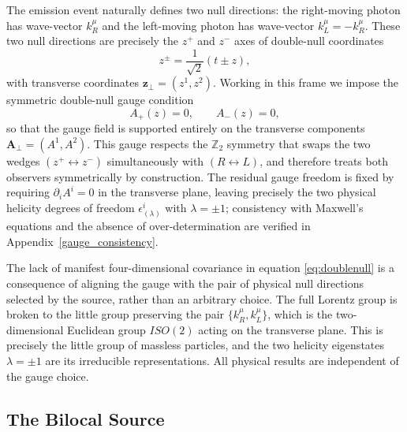 \documentclass[12pt,a4paper]{article}
\begin{document}
The emission event naturally defines two null directions: the right-moving photon has
wave-vector $k^\mu_R$ and the left-moving photon has wave-vector $k^\mu_L = -k^\mu_R$. These
two null directions are precisely the $z^+$ and $z^-$ axes of double-null coordinates
\begin{equation}
    z^\pm = \frac{1}{\sqrt{2}}(t \pm z),
\end{equation}
with transverse coordinates $\mathbf{z}_\perp = (z^1, z^2)$. Working in this frame we impose
the symmetric double-null gauge condition
\begin{equation}
    A_+(z) = 0, \qquad A_-(z) = 0,
\label{eq:doublenull}
\end{equation}
so that the gauge field is supported entirely on the transverse components $\mathbf{A}_\perp = (A^1, A^2)$. This gauge respects the $\mathbb{Z}_2$ symmetry that swaps the two wedges $(z^+ \leftrightarrow z^-)$ simultaneously with $(R \leftrightarrow L)$, and therefore treats both observers symmetrically by construction. The residual gauge freedom is fixed by requiring $\partial_i A^i = 0$ in the transverse plane, leaving precisely the two physical helicity degrees of freedom $\epsilon^i_{(\lambda)}$ with $\lambda = \pm 1$; consistency with 
Maxwell's equations and the absence of over-determination are 
verified in Appendix~\ref{gauge_consistency}.

The lack of manifest four-dimensional covariance in equation \eqref{eq:doublenull} is a consequence of aligning the gauge with the pair of physical null directions selected by the source, rather than an arbitrary choice. The full Lorentz group is broken to the little group preserving the pair $\{k^\mu_R, k^\mu_L\}$, which is the two-dimensional Euclidean group $ISO(2)$ acting on the transverse plane. This is precisely the little group of massless particles, and the two helicity eigenstates $\lambda = \pm 1$ are its irreducible representations. All physical results are independent of the gauge choice.

\subsection{The Bilocal Source}
\end{document}
